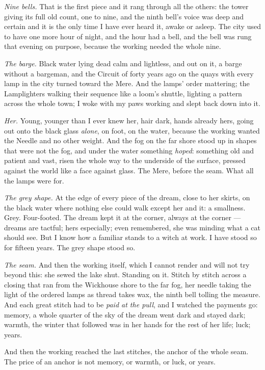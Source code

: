 \emph{Nine bells.} That is the first piece and it rang through all the others: the tower giving its full old count, one to nine, and the ninth bell's voice was deep and certain and it is the only time I have ever heard it, awake or asleep. The city used to have one more hour of night, and the hour had a bell, and the bell was rung that evening on purpose, because the working needed the whole nine.

\emph{The barge.} Black water lying dead calm and lightless, and out on it, a barge without a bargeman, and the Circuit of forty years ago on the quays with every lamp in the city turned toward the Mere. And the lamps' order mattering; the Lamplighters walking their sequence like a loom's shuttle, lighting a pattern across the whole town; I woke with my paws working and slept back down into it.

\emph{Her.} Young, younger than I ever knew her, hair dark, hands already hers, going out onto the black glass \emph{alone}, on foot, on the water, because the working wanted the Needle and no other weight. And the fog on the far shore stood up in shapes that were not the fog, and under the water something \emph{hoped}: something old and patient and vast, risen the whole way to the underside of the surface, pressed against the world like a face against glass. The Mere, before the seam. What all the lamps were for.

\emph{The grey shape.} At the edge of every piece of the dream, close to her skirts, on the black water where nothing else could walk except her and it: a smallness. Grey. Four-footed. The dream kept it at the corner, always at the corner --- dreams are tactful; hers especially; even remembered, she was minding what a cat should see. But I know how a familiar stands to a witch at work. I have stood so for fifteen years. The grey shape stood so.

\emph{The seam.} And then the working itself, which I cannot render and will not try beyond this: she sewed the lake shut. Standing on it. Stitch by stitch across a closing that ran from the Wickhouse shore to the far fog, her needle taking the light of the ordered lamps as thread takes wax, the ninth bell tolling the measure. And each great stitch had to be \emph{paid at the pull}, and I watched the payments go: memory, a whole quarter of the sky of the dream went dark and stayed dark; warmth, the winter that followed was in her hands for the rest of her life; luck; years.

And then the working reached the last stitches, the anchor of the whole seam. The price of an anchor is not memory, or warmth, or luck, or years.

